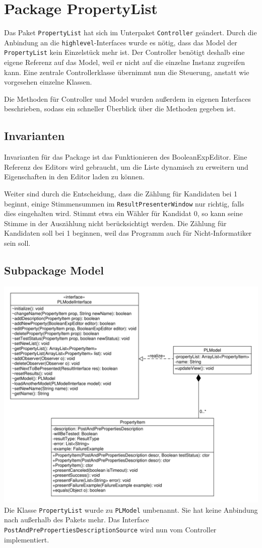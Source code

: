 \documentclass[a4paper]{scrreprt}
\begin{document}
\section{Package PropertyList}

Das Paket \verb!PropertyList! hat sich im Unterpaket \verb!Controller! geändert. Durch die Anbindung an die \verb!highlevel!-Interfaces wurde es nötig, dass das Model der \verb!PropertyList! kein Einzelstück mehr ist. Der Controller benötigt deshalb eine eigene Referenz auf das Model, weil er nicht auf die einzelne Instanz zugreifen kann. Eine zentrale Controllerklasse übernimmt nun die Steuerung, anstatt wie vorgesehen einzelne Klassen.

Die Methoden für Controller und Model wurden außerdem in eigenen Interfaces beschrieben, sodass ein schneller Überblick über die Methoden gegeben ist.

\subsection{Invarianten}
Invarianten für das Package ist das Funktionieren des BooleanExpEditor. Eine Referenz des Editors wird gebraucht, um die Liste dynamisch zu erweitern und Eigenschaften in den Editor laden zu können.

Weiter sind durch die Entscheidung, dass die Zählung für Kandidaten bei 1 beginnt, einige Stimmensummen im \verb!ResultPresenterWindow! nur richtig, falls dies eingehalten wird. Stimmt etwa ein Wähler für Kandidat 0, so kann seine Stimme in der Auszählung nicht berücksichtigt werden. Die Zählung für Kandidaten soll bei 1 beginnen, weil das Programm auch für Nicht-Informatiker sein soll.

\subsection{Subpackage Model}
\includegraphics[width=1.0\textwidth]{PropertyListModel.pdf}
Die Klasse \verb!PropertyList! wurde zu \verb!PLModel! umbenannt. Sie hat keine Anbindung nach außerhalb des Pakets mehr. Das Interface \verb!PostAndPrePropertiesDescriptionSource! wird nun vom Controller implementiert.
\end{document}
